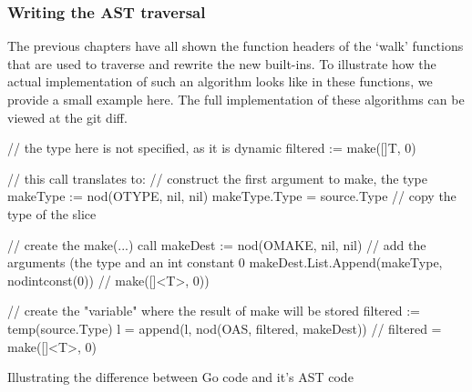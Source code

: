 \subsubsection{Writing the AST traversal}

The previous chapters have all shown the function headers of the `walk' functions
that are used to traverse and rewrite the new built-ins. To illustrate how the
actual implementation of such an algorithm looks like in these functions, we
provide a small example here. The full implementation of these algorithms can
be viewed at the git diff\autocite{ba-go1-14-thesis-diff}.

\begin{listing}
	\begin{gocode}
// the type here is not specified, as it is dynamic
filtered := make([]T, 0)

// this call translates to:
// construct the first argument to make, the type
makeType := nod(OTYPE, nil, nil)
makeType.Type = source.Type // copy the type of the slice

// create the make(...) call
makeDest := nod(OMAKE, nil, nil)
// add the arguments (the type and an int constant 0
makeDest.List.Append(makeType, nodintconst(0)) // make([]<T>, 0))

// create the "variable" where the result of make will be stored
filtered := temp(source.Type)
l = append(l, nod(OAS, filtered, makeDest)) // filtered = make([]<T>, 0)
\end{gocode}
	\caption{Illustrating the difference between Go code and it's AST code}
\end{listing}
